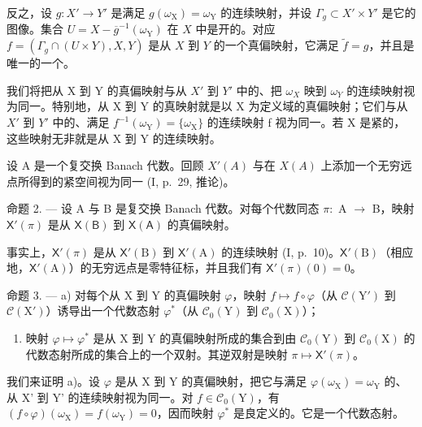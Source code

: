 反之，设 \(g \colon X' \to Y'\) 是满足 \(g(\omega_{\mathrm{X}}) = \omega_{\mathrm{Y}}\) 的连续映射，并设 \(\Gamma_g \subset X' \times Y'\) 是它的图像。集合 \(U = X - \overline{g}^{-1}(\omega_{\mathrm{Y}})\) 在 \(X\) 中是开的。对应 \(f = (\Gamma_g \cap (U \times Y), X, Y)\) 是从 \(X\) 到 \(Y\) 的一个真偏映射，它满足 \(\widetilde{f} = g\)，并且是唯一的一个。

我们将把从 X 到 Y 的真偏映射与从 \(X'\) 到 \(Y'\) 中的、把 \(\omega_{X}\) 映到 \(\omega_{Y}\) 的连续映射视为同一。特别地，从 X 到 Y 的真映射就是以 X 为定义域的真偏映射；它们与从 \(X'\) 到 \(Y'\) 中的、满足 \(f^{-1}(\omega_{\mathrm{Y}}) = \{\omega_{\mathrm{X}}\}\) 的连续映射 f 视为同一。若 X 是紧的，这些映射无非就是从 X 到 Y 的连续映射。

设 A 是一个复交换 Banach 代数。回顾 \(X'(A)\) 与在 \(X(A)\) 上添加一个无穷远点所得到的紧空间视为同一 (I, p.~29, 推论)。

命题 2. --- 设 A 与 B 是复交换 Banach 代数。对每个代数同态 \(\pi\colon\) A \(\to\) B，映射 \(\mathsf{X}'(\pi)\) 是从 \(\mathsf{X}(\mathsf{B})\) 到 \(\mathsf{X}(\mathsf{A})\) 的真偏映射。

事实上，\(\mathsf{X}'(\pi)\) 是从 \(\mathsf{X}'(\mathrm{B})\) 到 \(\mathsf{X}'(\mathrm{A})\) 的连续映射 (I, p.~10)。\(\mathsf{X}'(\mathrm{B})\)（相应地，\(\mathsf{X}'(\mathrm{A})\)）的无穷远点是零特征标，并且我们有 \(\mathsf{X}'(\pi)(0)=0\)。

命题 3. --- a) 对每个从 X 到 Y 的真偏映射 \(\varphi\)，映射 \(f \mapsto f \circ \varphi\)（从 \(\mathcal{C}(\mathrm{Y}')\) 到 \(\mathcal{C}(\mathrm{X}')\)）诱导出一个代数态射 \(\varphi^*\)（从 \(\mathcal{C}_0(\mathrm{Y})\) 到 \(\mathcal{C}_0(\mathrm{X})\)）；

\begin{enumerate}
\def\labelenumi{\alph{enumi})}
\setcounter{enumi}{1}
\tightlist
\item
  映射 \(\varphi \mapsto \varphi^{*}\) 是从 X 到 Y 的真偏映射所成的集合到由 \(\mathcal{C}_0(\mathrm{Y})\) 到 \(\mathcal{C}_0(\mathrm{X})\) 的代数态射所成的集合上的一个双射。其逆双射是映射 \(\pi \mapsto \mathsf{X}'(\pi)\)。
\end{enumerate}

我们来证明 a)。设 \(\varphi\) 是从 X 到 Y 的真偏映射，把它与满足 \(\varphi(\omega_{\mathrm{X}}) = \omega_{\mathrm{Y}}\) 的、从 X' 到 Y' 的连续映射视为同一。对 \(f \in \mathcal{C}_0(\mathrm{Y})\)，有 \((f \circ \varphi)(\omega_{\mathrm{X}}) = f(\omega_{\mathrm{Y}}) = 0\)，因而映射 \(\varphi^*\) 是良定义的。它是一个代数态射。

